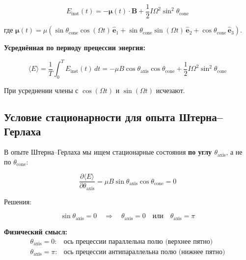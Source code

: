 \documentclass[12pt]{article}
\begin{document}
\begin{equation}
E_{\text{inst}}(t) = -\boldsymbol{\mu}(t) \cdot \boldsymbol{B} + \frac{1}{2} I \Omega^2 \sin^2\theta_{\text{cone}}
\label{eq:instantaneous_energy}
\end{equation}

где $\boldsymbol{\mu}(t) = \mu \left( \sin\theta_{\text{cone}} \cos(\Omega t) \, \hat{\boldsymbol{e}}_1 + \sin\theta_{\text{cone}} \sin(\Omega t) \, \hat{\boldsymbol{e}}_2 + \cos\theta_{\text{cone}} \, \hat{\boldsymbol{e}}_3 \right)$.

\textbf{Усреднённая по периоду прецессии энергия:}

\begin{equation}
\langle E \rangle = \frac{1}{T} \int_0^T E_{\text{inst}}(t) \, dt = -\mu B \cos\theta_{\text{axis}} \cos\theta_{\text{cone}} + \frac{1}{2} I \Omega^2 \sin^2\theta_{\text{cone}}
\label{eq:averaged_energy}
\end{equation}

При усреднении члены с $\cos(\Omega t)$ и $\sin(\Omega t)$ исчезают.

\subsection{Условие стационарности для опыта Штерна–Герлаха}

В опыте Штерна–Герлаха мы ищем стационарные состояния \textbf{по углу $\theta_{\text{axis}}$}, а не по $\theta_{\text{cone}}$:

\begin{equation}
\frac{\partial \langle E \rangle}{\partial \theta_{\text{axis}}} = \mu B \sin\theta_{\text{axis}} \cos\theta_{\text{cone}} = 0
\label{eq:stationarity_axis}
\end{equation}

Решения:

\begin{equation}
\sin\theta_{\text{axis}} = 0 \quad \Rightarrow \quad \theta_{\text{axis}} = 0 \quad \text{или} \quad \theta_{\text{axis}} = \pi
\label{eq:axis_solutions}
\end{equation}

\textbf{Физический смысл:}
\[
\begin{array}{ll}
\theta_{\text{axis}} = 0: & \text{ось прецессии параллельна полю (верхнее пятно)} \\
\theta_{\text{axis}} = \pi: & \text{ось прецессии антипараллельна полю (нижнее пятно)}
\end{array}
\]
\end{document}
